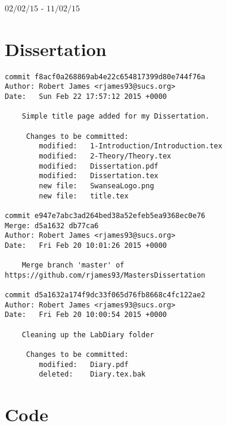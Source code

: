 \documentclass[12pt,a4paper,notitlepage,twoside]{memoir}
\author{Robert James}
\begin{document}
\begin{Large}
\begin{center}
$02/02/15$ - $11/02/15$
\end{center}
\end{Large}

\section{Dissertation}

\begin{lstlisting}[breaklines]
commit f8acf0a268869ab4e22c654817399d80e744f76a
Author: Robert James <rjames93@sucs.org>
Date:   Sun Feb 22 17:57:12 2015 +0000

    Simple title page added for my Dissertation.
    
     Changes to be committed:
    	modified:   1-Introduction/Introduction.tex
    	modified:   2-Theory/Theory.tex
    	modified:   Dissertation.pdf
    	modified:   Dissertation.tex
    	new file:   SwanseaLogo.png
    	new file:   title.tex

commit e947e7abc3ad264bed38a52efeb5ea9368ec0e76
Merge: d5a1632 db77ca6
Author: Robert James <rjames93@sucs.org>
Date:   Fri Feb 20 10:01:26 2015 +0000

    Merge branch 'master' of https://github.com/rjames93/MastersDissertation

commit d5a1632a174f9dc33f065d76fb8668c4fc122ae2
Author: Robert James <rjames93@sucs.org>
Date:   Fri Feb 20 10:00:54 2015 +0000

    Cleaning up the LabDiary folder
    
     Changes to be committed:
    	modified:   Diary.pdf
    	deleted:    Diary.tex.bak

\end{lstlisting}


\section{Code}
\end{document}

